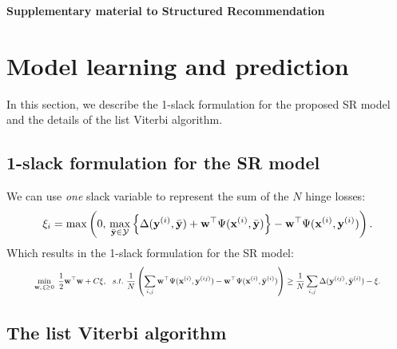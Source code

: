 \appendix
{\Large\bf Supplementary material to Structured Recommendation}

\section{Model learning and prediction}
\label{sec:supplement}

In this section, we describe the 1-slack formulation for the proposed SR model 
and the details of the list Viterbi algorithm.

\subsection{1-slack formulation for the SR model}
\label{ssec:1slack_sr}

We can use \emph{one} slack variable to represent the sum of the $N$ hinge losses:
\begin{equation*}
\xi_i = \max \left( 0, \, 
        \max_{\bar{\mathbf{y}} \in \mathcal{Y}}
        \left\{ \Delta(\mathbf{y}^{(i)}, \bar{\mathbf{y}}) + \mathbf{w}^\top \Psi(\mathbf{x}^{(i)}, \bar{\mathbf{y}}) \right\} - \mathbf{w}^\top \Psi(\mathbf{x}^{(i)}, \mathbf{y}^{(i)}) \right).
\end{equation*}
Which results in the 1-slack formulation for the SR model:
\begin{equation*}
\resizebox{0.9\linewidth}{!}{$
\begin{aligned}
\min_{\w, \, \xi \ge 0} ~\frac{1}{2} \w^\top \w + C \xi, ~~s.t.~ \frac{1}{N} \left( \sum_{i,j} \w^\top \Psi(\x^{(i)}, \y^{(ij)}) - \w^\top \Psi(\x^{(i)}, \bar{\y}^{(i)}) \right) 
  \ge \frac{1}{N} \sum_{i,j} \Delta(\y^{(ij)}, \bar{\y}^{(i)}) - \xi.
\end{aligned}
$}
\end{equation*}


\subsection{The list Viterbi algorithm}
\label{sec:listviterbi-supp}

